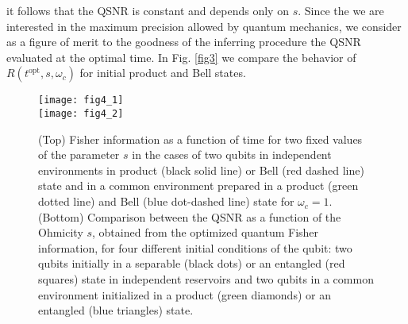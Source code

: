 \documentclass[ pra,a4paper,aps,twocolumn,superscriptaddress]{revtex4-1}
\def\tc#1{{\color{black}#1}}
\begin{document}
 it follows that the QSNR is constant and depends only on $s$. \tc{Since the we are interested in the maximum precision allowed by quantum mechanics, we consider as a figure of merit to the goodness of the inferring procedure the QSNR evaluated at the optimal time.}
 In Fig. \ref{fig3} we compare the behavior
 of $R(t^{\text{opt}},s,\omega_c)$ for initial product and Bell states.
\begin{figure}[t]
 \centering
 \texttt{[image: fig4\_1]}\\%
 \texttt{[image: fig4\_2]}
 \caption{\tc{(Top) Fisher information as a function of time for two fixed values of the parameter $s$ in the cases of two qubits in independent environments in product (black solid line) or Bell (red dashed line) state  and in a common environment prepared in a product (green dotted line) and Bell (blue dot-dashed line) state for $\omega_c=1$. (Bottom)
 } Comparison between the QSNR as a function of the Ohmicity  $s$, obtained from the optimized quantum Fisher information, for four different initial conditions of the qubit:  two qubits initially in a separable (black dots) or an entangled (red squares) state in  independent reservoirs and two qubits in a common environment initialized in a product (green diamonds) or an  entangled (blue triangles) state.}
  \label{fig4}
 \end{figure}
\end{document}
